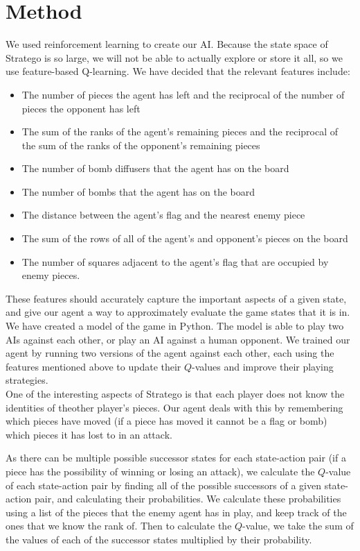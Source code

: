 \documentclass[letterpaper]{article}
\begin{document}
\section{Method}
We used reinforcement learning to create our AI. Because the state space of Stratego is so large, we will not be able to actually explore or store it all, so we use feature-based Q-learning. We have decided that the relevant features include: 
\begin{itemize}
\item The number of pieces the agent has left and the reciprocal of the number of pieces the opponent has left
\item The sum of the ranks of the agent's remaining pieces and the reciprocal of the sum of the ranks of the opponent's remaining pieces
\item The number of bomb diffusers that the agent has on the board 
\item The number of bombs that the agent has on the board 
\item The distance between the agent's flag and the nearest enemy piece 
\item  The sum of the rows of all of the agent's and opponent's pieces on the board
\item The number of squares adjacent to the agent's flag that are occupied by enemy pieces.
\end{itemize}
These features should accurately capture the important aspects of a given state, and give our agent a way to approximately 
evaluate the game states that it is in.\\

We have created a model of the game in Python. The model is able to play two AIs against each other, or play an AI against a human opponent. We trained our agent by running two versions of the agent against each other, each using the features mentioned above to update their $Q$-values and improve their playing strategies.\\

One of the interesting aspects of Stratego is that each player does not know the identities of theother player's pieces. 
Our agent deals with this by remembering which pieces have moved (if a piece has moved it cannot be a flag or bomb) which
pieces it has lost to in an attack. 

As there can be multiple possible successor states for each state-action pair (if a piece has the possibility of winning
or losing an attack), we calculate the $Q$-value of each state-action pair by finding all of the possible successors of a given state-action pair, and calculating their probabilities. We calculate these probabilities using a list of the pieces that the enemy agent has in play, and keep track of the ones that we know the rank of. Then to calculate the $Q$-value, we take the sum of the values of each of the successor states multiplied by their probability.\\
\end{document}
